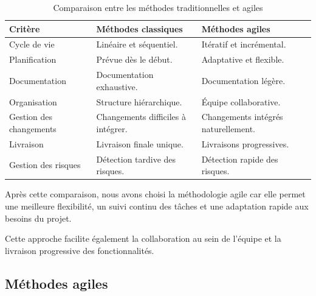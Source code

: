 \begin{table}[H]
	\centering
	\renewcommand{\arraystretch}{1.6}
	
	\begin{tabularx}{\textwidth}{|>{\centering\arraybackslash}m{3.5cm}|X|X|}
		\hline
		
		\rowcolor{gray!25}
		\textbf{Critère} &
		\textbf{Méthodes classiques} &
		\textbf{Méthodes agiles}
		\\ \hline
		
		Cycle de vie &
		Linéaire et séquentiel. &
		Itératif et incrémental.
		\\ \hline
		
		Planification &
		Prévue dès le début. &
		Adaptative et flexible.
		\\ \hline
		
		Documentation &
		Documentation exhaustive. &
		Documentation légère.
		\\ \hline
		
		Organisation &
		Structure hiérarchique. &
		Équipe collaborative.
		\\ \hline
		
		Gestion des changements &
		Changements difficiles à intégrer. &
		Changements intégrés naturellement.
		\\ \hline
		
		Livraison &
		Livraison finale unique. &
		Livraisons progressives.
		\\ \hline
		
		Gestion des risques &
		Détection tardive des risques. &
		Détection rapide des risques.
		\\ \hline
		
	\end{tabularx}
	
	\caption{Comparaison entre les méthodes traditionnelles et agiles}
	\label{tab:comparaison_methodes}
	
\end{table}

Après cette comparaison, nous avons choisi la méthodologie agile car elle permet une meilleure flexibilité, un suivi continu des tâches et une adaptation rapide aux besoins du projet.

Cette approche facilite également la collaboration au sein de l’équipe et la livraison progressive des fonctionnalités.

\subsection{Méthodes agiles}


